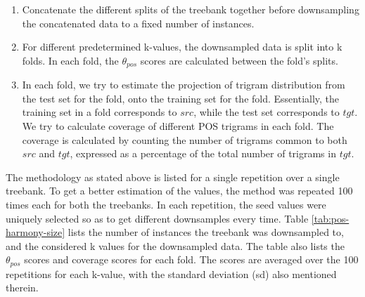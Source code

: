 \begin{enumerate}
    \item Concatenate the different splits of the treebank together before downsampling the concatenated data to a fixed number of instances.
    \item For different predetermined k-values, the downsampled data is split into k folds. In each fold, the $\theta_{pos}$ scores are calculated between the fold's splits.
    \item In each fold, we try to estimate the projection of trigram distribution from the test set for the fold, onto the training set for the fold. Essentially, the training set in a fold corresponds to $src$, while the test set corresponds to $tgt$. We try to calculate coverage of different POS trigrams in each fold. The coverage is calculated by counting the number of trigrams common to both $src$ and $tgt$, expressed as a percentage of the total number of trigrams in $tgt$.
\end{enumerate}

The methodology as stated above is listed for a single repetition over a single treebank. To get a better estimation of the values, the method was repeated 100 times each for both the treebanks. In each repetition, the seed values were uniquely selected so as to get different downsamples every time. Table \ref{tab:pos-harmony-size} lists the number of instances the treebank was downsampled to, and the considered k values for the downsampled data. The table also lists the $\theta_{pos}$ scores and coverage scores for each fold. The scores are averaged over the 100 repetitions for each k-value, with the standard deviation (sd) also mentioned therein.


